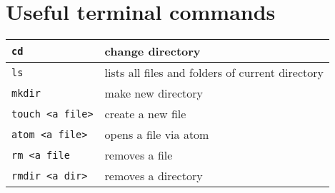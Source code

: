 \documentclass[12pt, twoside]{article}
\begin{document}
	
	\section{Useful terminal commands}
	
	\begin{center}
		\begin{tabular}{l|l}
			\verb|cd| & change directory \\ \hline
			\verb|ls| & lists all files and folders of current directory \\ \hline
			\verb|mkdir| & make new directory \\ \hline
			\verb|touch <a file>| & create a new file \\ \hline
			\verb|atom <a file>| & opens a file via atom \\ \hline
			\verb|rm <a file| & removes a file \\ \hline
			\verb|rmdir <a dir>| & removes a directory
		\end{tabular}
	\end{center}
	
\end{document}
